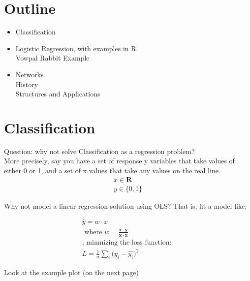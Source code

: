 

\section{Outline}

\begin{itemize}
  \item Classification
  \item Logistic Regression, with examples in R \\
  Vowpal Rabbit Example
  \item Networks \\
  History\\
  Structures and Applications
\end{itemize}


\section{Classification}
Question: why not solve Classification as a regression problem?\\

More precisely, say you have a set of response y variables that take values of either 0 or 1, and a set of x values that take any values on the real line.
\begin{eqnarray*}
  x \in \mathbf{R} \\
  y \in \{0, 1\}
\end{eqnarray*}

Why not model a linear regression solution using OLS? That is, fit a model like:

\begin{eqnarray*}
  \hat{y} = w \cdot x \\
  \textrm{ where }
  w = \frac{ \mathbf{x} \cdot \mathbf{y} }{\mathbf{x} \cdot \mathbf{x}} \\
  \textrm{, minmizing the loss function: }\\
  L = \frac{1}{n} \sum_i \big(y_i - \hat{y_i}\big)^2
\end{eqnarray*}

Look at the example plot (on the next page)

